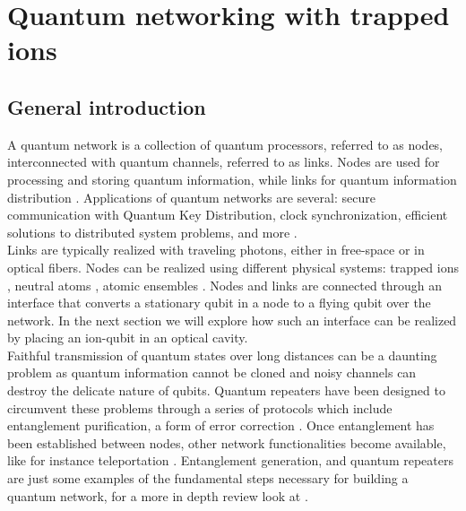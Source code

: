 \section{Quantum networking with trapped ions}
\subsection{General introduction}
A quantum network is a collection of quantum processors, referred to as nodes, interconnected with quantum channels, referred to as links. Nodes are used for processing and storing quantum information, while links for quantum information distribution \cite{kimble}. %
Applications of quantum networks are several: secure communication with Quantum Key Distribution, clock synchronization, efficient solutions to distributed system problems, and more \cite{Wehnereaam9288}.\\
Links are typically realized with traveling photons, either in free-space \cite{Hughes2002} or in optical fibers. Nodes can be realized using different physical systems: trapped ions \cite{ion_quantumnetwork}, neutral atoms \cite{Ritter2012}, atomic ensembles \cite{kimble}. Nodes and links are connected through an interface that converts a stationary qubit in a node to a flying qubit over the network.  In the next section we will explore how such an interface can be realized by placing an ion-qubit in an optical cavity.\\
Faithful transmission of quantum states over long distances can be a daunting problem as quantum information cannot be cloned \cite{nocloning} and noisy channels can destroy the delicate nature of qubits. Quantum repeaters have been designed \cite{quantumrepeters} to circumvent these problems through a series of protocols which include entanglement purification, a form of error correction \cite{Pan2001}. Once entanglement has been established between nodes, other network functionalities become available, like for instance teleportation \cite{PhysRevLett.70.1895}. Entanglement generation, and quantum repeaters are just some examples of the fundamental steps necessary for building a quantum network, for a more in depth review look at \cite{Wehnereaam9288}.



